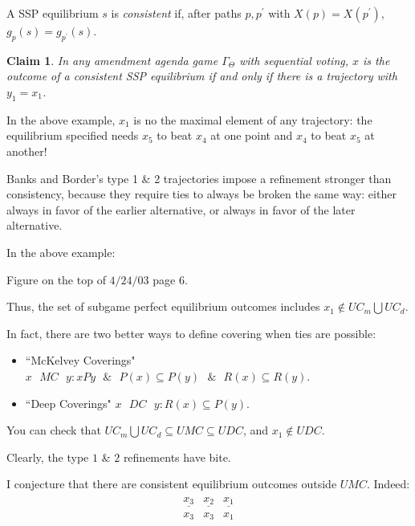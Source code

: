 \documentclass[12pt]{article}
\newtheorem{claimo}[propo]{Claim}
\newcommand{\n}{\noindent}
\newcommand{\s}{\vspace{5mm}}
\begin{document}
\s
\n A SSP equilibrium $s$ is \textit{consistent} if, after paths $p,p^{\prime}$ with $X(p)=X(p^{\prime})$, $g_p(s)=g_{p^{\prime}}(s)$.  

\s
\n\begin{claimo}  In any amendment agenda game $\Gamma_{\Theta}$ with sequential voting, $x$ is the outcome of a consistent SSP equilibrium if and only if there is a trajectory with $y_1=x_1$.
\end{claimo}

\s
\n  In the above example, $x_1$ is no the maximal element of any trajectory: the equilibrium specified needs $x_5$ to beat $x_4$ at one point and $x_4$ to beat $x_5$ at another!

\s
\n  Banks and Border's type 1 \& 2 trajectories impose a refinement stronger than consistency, because they require ties to always be broken the same way: either always in favor of the earlier alternative, or always in favor of the later alternative.

\s
\n  In the above example:
\begin{center}  Figure on the top of $4/24/03$ page $6$.  
\end{center}
\n Thus, the set of subgame perfect equilibrium outcomes includes $x_1\notin UC_m\bigcup UC_d$.

\s
\n  In fact, there are two better ways to define covering when ties are possible:
\begin{itemize}
\item ``McKelvey Coverings"  $x\mbox{ }MC\mbox{ }y:xPy\mbox{ }\&\mbox{ }P(x)\subseteq P(y)\mbox{ }\&\mbox{ }R(x)\subseteq R(y)$.
\item ``Deep Coverings" $x\mbox{ }DC\mbox{ }y:R(x)\subseteq P(y)$.
\end{itemize}  You can check that $UC_m\bigcup UC_d\subseteq UMC\subseteq UDC$, and $x_1\notin UDC$.

\s
\n  Clearly, the type $1$ \& $2$ refinements have bite.

\s
\n  I conjecture that there are consistent equilibrium outcomes outside $UMC$.  Indeed:
\begin{eqnarray*}
\begin{array}{ccc}
\underline{x_3}&\underline{x_2}&\underline{x_1}\\
x_3&x_3&x_1\\
\end{array}
\end{eqnarray*}
\end{document}
